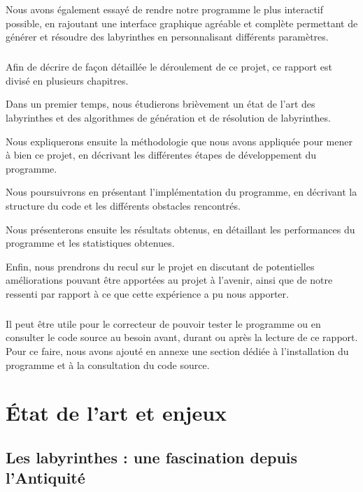 \documentclass[12pt]{scrreprt} %
\begin{document}
Nous avons également essayé de rendre notre programme le plus interactif possible, en rajoutant une interface graphique agréable et complète permettant de générer et résoudre des labyrinthes en personnalisant différents paramètres.

\paragraph{}

Afin de décrire de façon détaillée le déroulement de ce projet, ce rapport est divisé en plusieurs chapitres.

Dans un premier temps, nous étudierons brièvement un état de l'art des labyrinthes et des algorithmes de génération et de résolution de labyrinthes.

Nous expliquerons ensuite la méthodologie que nous avons appliquée pour mener à bien ce projet, en décrivant les différentes étapes de développement du programme.

Nous poursuivrons en présentant l'implémentation du programme, en décrivant la structure du code et les différents obstacles rencontrés.

Nous présenterons ensuite les résultats obtenus, en détaillant les performances du programme et les statistiques obtenues.

Enfin, nous prendrons du recul sur le projet en discutant de potentielles améliorations pouvant être apportées au projet à l'avenir, ainsi que de notre ressenti par rapport à ce que cette expérience a pu nous apporter.

\paragraph{}

Il peut être utile pour le correcteur de pouvoir tester le programme ou en consulter le code source au besoin avant, durant ou après la lecture de ce rapport. Pour ce faire, nous avons ajouté en annexe une section dédiée à l'installation du programme et à la consultation du code source.

\chapter{État de l'art et enjeux}


\section{Les labyrinthes : une fascination depuis l'Antiquité}
\end{document}
